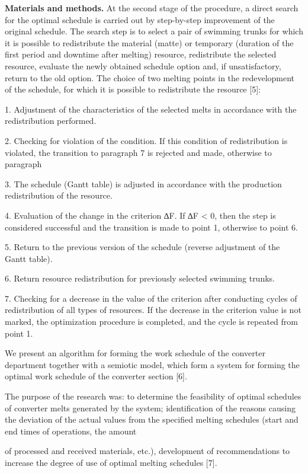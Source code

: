 \textbf{Materials and methods.} At the second stage of the procedure, a
direct search for the optimal schedule is carried out by step-by-step
improvement of the original schedule. The search step is to select a
pair of swimming trunks for which it is possible to redistribute the
material (matte) or temporary (duration of the first period and downtime
after melting) resource, redistribute the selected resource, evaluate
the newly obtained schedule option and, if unsatisfactory, return to the
old option. The choice of two melting points in the redevelopment of the
schedule, for which it is possible to redistribute the resource {[}5{]}:

1. Adjustment of the characteristics of the selected melts in accordance
with the redistribution performed.

2. Checking for violation of the condition. If this condition of
redistribution is violated, the transition to paragraph 7 is rejected
and made, otherwise to paragraph

3. The schedule (Gantt table) is adjusted in accordance with the
production redistribution of the resource.

4. Evaluation of the change in the criterion ∆F. If ∆F \textless{} 0,
then the step is considered successful and the transition is made to
point 1, otherwise to point 6.

5. Return to the previous version of the schedule (reverse adjustment of
the Gantt table).

6. Return resource redistribution for previously selected swimming
trunks.

7. Checking for a decrease in the value of the criterion after
conducting cycles of redistribution of all types of resources. If the
decrease in the criterion value is not marked, the optimization
procedure is completed, and the cycle is repeated from point 1.

We present an algorithm for forming the work schedule of the converter
department together with a semiotic model, which form a system for
forming the optimal work schedule of the converter section {[}6{]}.

The purpose of the research was: to determine the feasibility of optimal
schedules of converter melts generated by the system; identification of
the reasons causing the deviation of the actual values from the
specified melting schedules (start and end times of operations, the
amount

of processed and received materials, etc.), development of
recommendations to increase the degree of use of optimal melting
schedules {[}7{]}.

